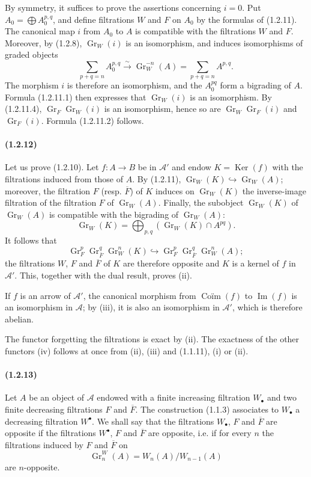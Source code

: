 \documentclass[10pt]{article}
\newcommand{\Gr}{\operatorname{Gr}}
\newcommand{\Ker}{\operatorname{Ker}}
\newcommand{\Imop}{\operatorname{Im}}
\newcommand{\fg}{\guillemotright}
\newcommand{\og}{\guillemotleft}
\newcommand{\calA}{\mathcal A}
\newcommand{\iso}{\xrightarrow{\sim}}
\begin{document}
By symmetry, it suffices to prove the assertions concerning $i=0$. Put $A_0=\bigoplus A_0^{p,q}$, and define filtrations $W$ and $F$ on $A_0$ by the formulas of (1.2.11). The canonical map $i$ from $A_0$ to $A$ is compatible with the filtrations $W$ and $F$. Moreover, by (1.2.8), $\Gr_W(i)$ is an isomorphism, and induces isomorphisms of graded objects
\[
\tag{1.2.11.4}
\sum_{p+q=n} A_0^{p,q}\iso \Gr_W^{-n}(A)=\sum_{p+q=n}A^{p,q}.
\]
The morphism $i$ is therefore an isomorphism, and the $A_0^{pq}$ form a bigrading of $A$. Formula (1.2.11.1) then expresses that $\Gr_W(i)$ is an isomorphism. By (1.2.11.4), $\Gr_F\Gr_W(i)$ is an isomorphism, hence so are $\Gr_W\Gr_F(i)$ and $\Gr_F(i)$. Formula (1.2.11.2) follows.

\paragraph{(1.2.12)} Let us prove (1.2.10). Let $f:A\to B$ be in $\calA'$ and endow $K=\Ker(f)$ with the filtrations induced from those of $A$. By (1.2.11), $\Gr_W(K)\hookrightarrow\Gr_W(A)$; moreover, the filtration $F$ (resp. $\overline F$) of $K$ induces on $\Gr_W(K)$ the inverse-image filtration of the filtration $F$ of $\Gr_W(A)$. Finally, the subobject $\Gr_W(K)$ of $\Gr_W(A)$ is compatible with the bigrading of $\Gr_W(A)$:
\[
\Gr_W(K)=\bigoplus_{p,q}(\Gr_W(K)\cap A^{pq}).
\]
It follows that
\[
\Gr_F^p\Gr_{\overline F}^{q}\Gr_W^n(K)\hookrightarrow \Gr_F^p\Gr_{\overline F}^{q}\Gr_W^n(A);
\]
the filtrations $W$, $F$ and $\overline F$ of $K$ are therefore opposite and $K$ is a kernel of $f$ in $\calA'$. This, together with the dual result, proves (ii).

If $f$ is an arrow of $\calA'$, the canonical morphism from $\operatorname{Coïm}(f)$ to $\Imop(f)$ is an isomorphism in $\calA$; by (iii), it is also an isomorphism in $\calA'$, which is therefore abelian.

The functor \og forgetting the filtrations\fg{} is exact by (ii). The exactness of the other functors (iv) follows at once from (ii), (iii) and (1.1.11), (i) or (ii).

\paragraph{(1.2.13)} Let $A$ be an object of $\calA$ endowed with a finite increasing filtration $W_\bullet$ and two finite decreasing filtrations $F$ and $\overline F$. The construction (1.1.3) associates to $W_\bullet$ a decreasing filtration $W^\bullet$. We shall say that the filtrations $W_\bullet$, $F$ and $\overline F$ are opposite if the filtrations $W^\bullet$, $F$ and $\overline F$ are opposite, i.e. if for every $n$ the filtrations induced by $F$ and $\overline F$ on
\[
\Gr_n^W(A)=W_n(A)/W_{n-1}(A)
\]
are $n$-opposite.
\end{document}
